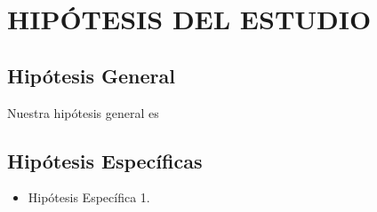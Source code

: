 \section{HIPÓTESIS DEL ESTUDIO}
\subsection{Hipótesis General}

Nuestra hipótesis general es

\subsection{Hipótesis Específicas}
\begin{itemize}
	\item

	      Hipótesis Específica 1.
\end{itemize}
